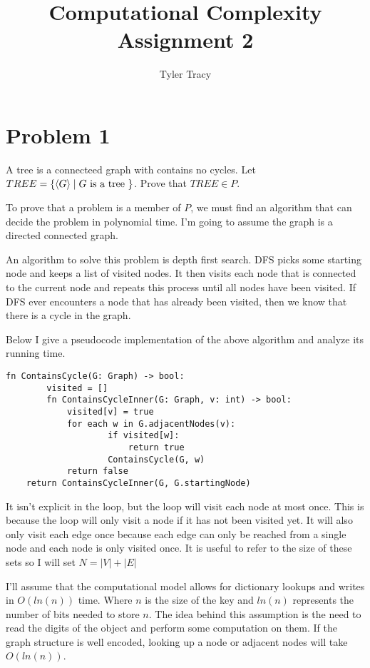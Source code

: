 \documentclass[12pt]{article}
\title{Computational Complexity Assignment 2}
\author{Tyler Tracy}
\begin{document}
\section*{Problem 1}

\begin{questionbox}
	A tree is a connecteed graph with contains no cycles. Let $TREE = \{ \braket{G} \mid G \text{ is a tree } \}$. Prove that $TREE \in P$.
\end{questionbox}

To prove that a problem is a member of $P$, we must find an algorithm that can decide the problem in polynomial time. I'm going to assume the graph is a directed connected graph.

An algorithm to solve this problem is depth first search. DFS picks some starting node and keeps a list of visited nodes. It then visits each node that is connected to the current node and repeats this process until all nodes have been visited. If DFS ever encounters a node that has already been visited, then we know that there is a cycle in the graph.

Below I give a pseudocode implementation of the above algorithm and analyze its running time.

\begin{lstlisting}[basicstyle=\small, tabsize=3]
	fn ContainsCycle(G: Graph) -> bool:
		visited = []
		fn ContainsCycleInner(G: Graph, v: int) -> bool:
			visited[v] = true
			for each w in G.adjacentNodes(v):
					if visited[w]:
						return true
					ContainsCycle(G, w)
			return false
	return ContainsCycleInner(G, G.startingNode)
\end{lstlisting}

It isn't explicit in the loop, but the loop will visit each node at most once. This is because the loop will only visit a node if it has not been visited yet. It will also only visit each edge once because each edge can only be reached from a single node and each node is only visited once. It is useful to refer to the size of these sets so I will set $N = |V| + |E|$

I'll assume that the computational model allows for dictionary lookups and writes in $O(ln(n))$ time. Where $n$ is the size of the key and $ln(n)$ represents the number of bits needed to store $n$. The idea behind this assumption is the need to read the digits of the object and perform some computation on them. If the graph structure is well encoded, looking up a node or adjacent nodes will take $O(ln(n))$.
\end{document}
